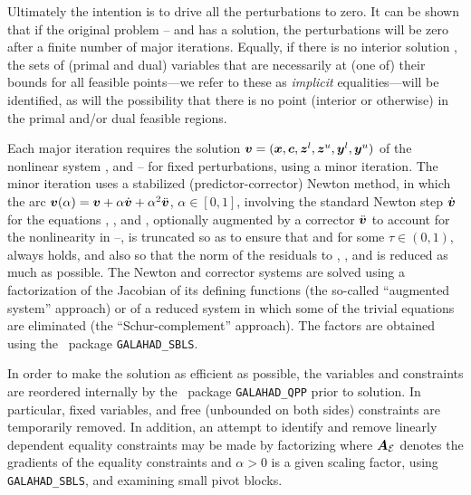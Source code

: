 \documentclass{galahad}
\begin{document}
Ultimately the intention is to drive all the perturbations to zero. 
It can be shown that if the original problem --
and 
has a solution, the perturbations will be zero after a finite number of major 
iterations. Equally, if there is no interior solution  , 
the sets of (primal and dual) variables that are necessarily at (one of) their
bounds for all feasible points---we refer to these as {\em implicit} 
equalities---will be identified, as will the possibility that there is
no point (interior or otherwise) in the primal and/or dual feasible regions.

Each major iteration requires the solution 
${\bm{v}} = ({\bm{x}},{\bm{c}},{\bm{z}}^l,{\bm{z}}^u,{\bm{y}}^l,{\bm{y}}^u)$
of the nonlinear system
,  and --
for fixed perturbations, using a minor iteration. The minor iteration
uses a stabilized (predictor-corrector) Newton method, 
in which the arc 
${\bm{v}}(\alpha) = {\bm{v}} + \alpha \dot{{\bm{v}}} + \alpha^2 \ddot{{\bm{v}}}$, $\alpha \in 
[0,1]$,
involving the standard Newton step $\dot{{\bm{v}}}$
for the equations , , 
and , optionally augmented by a corrector $\ddot{{\bm{v}}}$
to account for the nonlinearity in --,
is truncated so as to ensure that
and 
for some $\tau \in (0,1)$, always holds, and also so that the norm
of the residuals to 
, ,  and 
is reduced as much as possible. 
The Newton and corrector systems are solved using a factorization of
the Jacobian of its defining functions (the so-called ``augmented system''
approach) or of a reduced system in which some of the trivial equations are
eliminated (the ``Schur-complement'' approach).
The factors are obtained using the \galahad\ package {\tt GALAHAD\_SBLS}.

In order to make the solution as efficient as possible, the 
variables and constraints are reordered internally
by the \galahad\ package {\tt GALAHAD\_QPP} prior to solution. 
In particular, fixed variables, and 
free (unbounded on both sides) constraints are temporarily removed.
In addition, an attempt to identify and remove linearly dependent
equality constraints may be made by factorizing
where $\bmA_{\cal E}$  denotes the gradients of the equality constraints and
$\alpha > 0$ is a given scaling factor,
using {\tt GALAHAD\_SBLS}, and examining small pivot blocks.
\end{document}
